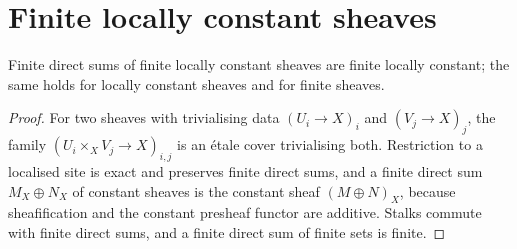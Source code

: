 \section{Finite locally constant sheaves}\label{sec:constructible-flc}

\begin{lemma}\label{lemma:constructible-flc-biproduct}
\leanok
Finite direct sums of finite locally constant sheaves are finite locally
constant; the same holds for locally constant sheaves and for finite
sheaves.
\end{lemma}
\begin{proof}
\leanok
For two sheaves with trivialising data $(U_i\to X)_i$ and $(V_j\to X)_j$,
the family $(U_i\times_XV_j\to X)_{i,j}$ is an \'etale cover trivialising
both.  Restriction to a localised site is exact and preserves finite direct
sums, and a finite direct sum $M_X\oplus N_X$ of constant sheaves is the
constant sheaf $(M\oplus N)_X$, because sheafification and the constant
presheaf functor are additive.  Stalks commute with finite direct sums,
and a finite direct sum of finite sets is finite.
\end{proof}

